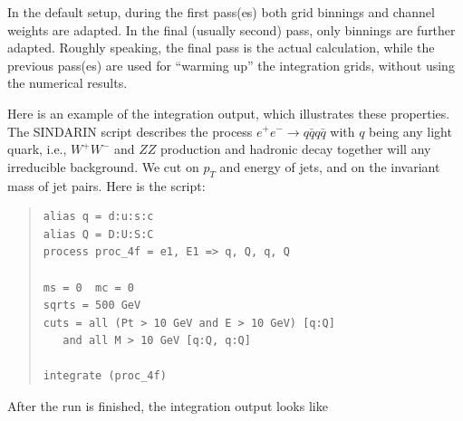 \documentclass[12pt]{book}
\begin{document}
In the default setup, during the first pass(es) both grid binnings and channel
weights are adapted.  In the final (usually second) pass, only binnings are
further adapted.  Roughly speaking, the final pass is the actual calculation,
while the previous pass(es) are used for ``warming up'' the integration grids,
without using the numerical results.

Here is an example of the integration output, which illustrates these
properties.  The SINDARIN script describes the process $e^+e^-\to q\bar q
q\bar q$ with $q$ being any light quark, i.e., $W^+W^-$ and $ZZ$ production
and hadronic decay together will any irreducible background.  We cut on $p_T$
and energy of jets, and on the invariant mass of jet pairs.  Here is the
script:
\begin{quote}
\begin{footnotesize}
\begin{verbatim}
alias q = d:u:s:c
alias Q = D:U:S:C
process proc_4f = e1, E1 => q, Q, q, Q

ms = 0  mc = 0
sqrts = 500 GeV
cuts = all (Pt > 10 GeV and E > 10 GeV) [q:Q] 
   and all M > 10 GeV [q:Q, q:Q]

integrate (proc_4f)
\end{verbatim}
\end{footnotesize}
\end{quote}
After the run is finished, the integration output looks like
\end{document}
